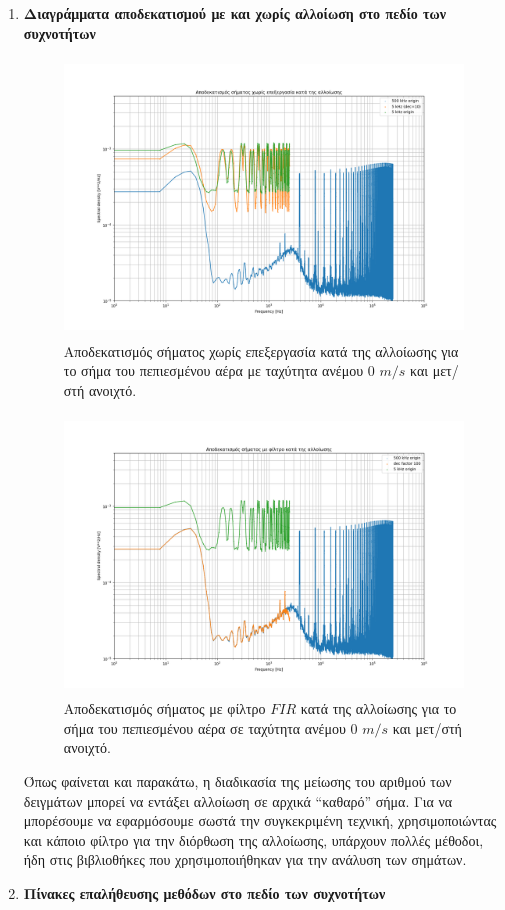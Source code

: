 \documentclass[breaklines=true, 12pt]{article}
\begin{document}
\begin{enumerate}
\item \textbf{Διαγράμματα αποδεκατισμού με και χωρίς αλλοίωση στο πεδίο των συχνοτήτων}
\label{sec:org283061e}
\begin{figure}[htbp]
\centering
\includegraphics[width=500px,height=280px]{./decimation/with_aliasing.png}
\caption{\label{fig:with_al}Αποδεκατισμός σήματος χωρίς επεξεργασία κατά της αλλοίωσης για το σήμα του πεπιεσμένου αέρα με ταχύτητα ανέμου 0 \(m/s\) και μετ/στή ανοιχτό.}
\end{figure}

\begin{figure}[htbp]
\centering
\includegraphics[width=500px,height=280px]{./decimation/anti_aliasing_fir.png}
\caption{\label{without_al}Αποδεκατισμός σήματος με φίλτρο \(FIR\) κατά της αλλοίωσης για το σήμα του πεπιεσμένου αέρα σε ταχύτητα ανέμου 0 \(m/s\) και μετ/στή ανοιχτό.}
\end{figure}

Όπως φαίνεται και παρακάτω, η διαδικασία της μείωσης του αριθμού των
δειγμάτων μπορεί να εντάξει αλλοίωση σε αρχικά “καθαρό” σήμα. Για να
μπορέσουμε να εφαρμόσουμε σωστά την συγκεκριμένη τεχνική, χρησιμοποιώντας
και κάποιο φίλτρο για την διόρθωση της αλλοίωσης, υπάρχουν πολλές μέθοδοι,
ήδη στις βιβλιοθήκες που χρησιμοποιήθηκαν για την ανάλυση των σημάτων.
\clearpage
\item \textbf{Πίνακες επαλήθευσης μεθόδων στο πεδίο των συχνοτήτων}
\label{sec:orga46692e}


\end{enumerate}
\end{document}
